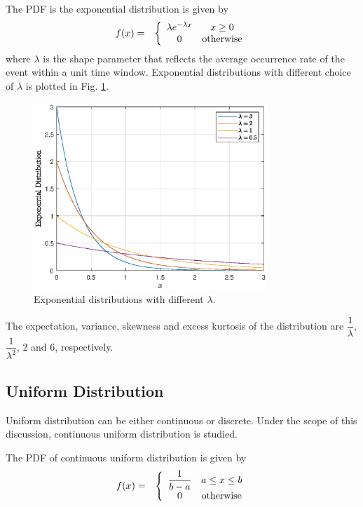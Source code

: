 The PDF is the exponential distribution is given by
\begin{eqnarray}
	f(x) &=& \left\{\begin{array}{cc}
		\lambda e^{-\lambda x} & x \geq 0 \\
		0 & \textup{otherwise}
	\end{array}\right. \label{eq:exponential_pdf}
\end{eqnarray}
where $\lambda$ is the shape parameter that reflects the average occurrence rate of the event within a unit time window. Exponential distributions with different choice of $\lambda$ is plotted in Fig. \ref{fig:exponential}.
\begin{figure}[!htb]
	\centering
	\includegraphics[width=250pt]{chapters/part-1/figures/exponential_pdf.eps}
	\caption{Exponential distributions with different $\lambda$.} \label{fig:exponential}
\end{figure}

The expectation, variance, skewness and excess kurtosis of the distribution are $\dfrac{1}{\lambda}$, $\dfrac{1}{\lambda^2}$, $2$ and $6$, respectively.

\subsection{Uniform Distribution}

Uniform distribution can be either continuous or discrete. Under the scope of this discussion, continuous uniform distribution is studied.

The PDF of continuous uniform distribution is given by
\begin{eqnarray}
  f(x) &=& \left\{\begin{array}{cc}
                    \dfrac{1}{b-a} & a \leq x \leq b \\
                    0 & \textup{otherwise}
                  \end{array}\right. \nonumber
\end{eqnarray}

